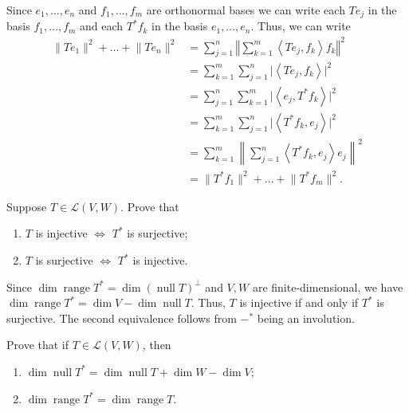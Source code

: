 \documentclass[12 pt, letterpaper]{hmcpset}
\begin{document}
\begin{solution}
	Since $e_{1}, \dots, e_{n}$ and $f_{1}, \dots, f_{m}$ are orthonormal bases we can write each $T e_{j}$ in the basis $f_{1}, \dots, f_{m}$ and each $T^{*} f_{k}$ in the basis $e_{1}, \dots, e_{n}$. Thus, we can write
	\[
		\begin{split}
			\lVert T e_{1} \rVert^{2} + \dots + \lVert T e_{n} \rVert^{2} & = \sum_{j = 1}^{n} \left \Vert \sum_{k = 1}^{m} \left < T e_{j}, f_{k} \right > f_{k} \right \Vert^{2} \\
										      & = \sum_{k = 1}^{m} \sum_{j = 1}^{n} \lvert \left < T e_{j}, f_{k} \right > \rvert^{2} \\
										      & = \sum_{j = 1}^{n} \sum_{k = 1}^{m} \lvert \left < e_{j}, T^{*} f_{k} \right > \rvert^{2} \\
										      & = \sum_{k = 1}^{m} \sum_{j = 1}^{n} \lvert \left < T^{*} f_{k}, e_{j} \right > \rvert^{2} \\
										      & = \sum_{k = 1}^{m} \left \lVert \sum_{j = 1}^{n} \left < T^{*} f_{k}, e_{j} \right > e_{j} \right \rVert^{2} \\
										      & = \lVert T^{*} f_{1} \rVert^{2} + \dots + \lVert T^{*} f_{m} \rVert^{2}.
		\end{split}
	\]
\end{solution}

\pagebreak

\begin{problem}[6]
	Suppose $T \in \mathcal{L}(V, W)$. Prove that
	\begin{enumerate}
		\item $T$ is injective $\iff$ $T^{*}$ is surjective;
		\item $T$ is surjective $\iff$ $T^{*}$ is injective.
	\end{enumerate}
\end{problem}

\begin{solution}
	Since $\dim \operatorname{range} T^{*} = \dim (\operatorname{null} T)^{\perp}$ and $V, W$ are finite-dimensional, we have $\dim \operatorname{range} T^{*} = \dim V - \dim \operatorname{null} T$. Thus, $T$ is injective if and only if $T^{*}$ is surjective. The second equivalence follows from $-^{*}$ being an involution.
\end{solution}

\pagebreak

\begin{problem}[7]
	Prove that if $T \in \mathcal{L}(V, W)$, then
	\begin{enumerate}
		\item $\dim \operatorname{null} T^{*} = \dim \operatorname{null} T + \dim W - \dim V$;
		\item $\dim \operatorname{range} T^{*} = \dim \operatorname{range} T$.
	\end{enumerate}
\end{problem}
\end{document}
